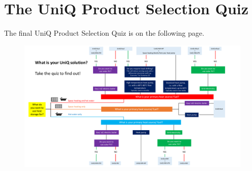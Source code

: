 
\chapter{The UniQ Product Selection Quiz} %

\label{AppendixB} %


The final UniQ Product Selection Quiz is on the following page.

%

\begin{figure}
	\centering
	\includegraphics[height=\textheight]{Appendices/final_quiz.pdf}
\end{figure}